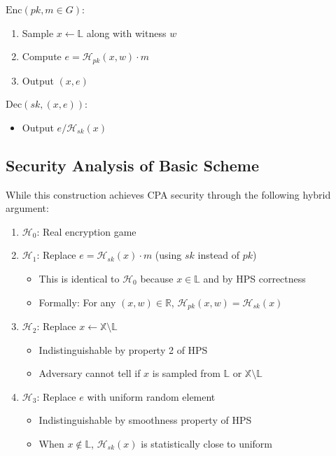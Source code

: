 $\text{Enc}(pk,m \in G)$:
\begin{enumerate}
    \item Sample $x \leftarrow \mathbb{L}$ along with witness $w$
    \item Compute $e = \mathcal{H}_{pk}(x,w) \cdot m$
    \item Output $(x,e)$
\end{enumerate}

$\text{Dec}(sk,(x,e))$:
\begin{itemize}
    \item Output $e/\mathcal{H}_{sk}(x)$
\end{itemize}

\subsection{Security Analysis of Basic Scheme}

While this construction achieves CPA security through the following hybrid argument:

\begin{enumerate}
    \item $\mathcal{H}_0$: Real encryption game
    \item $\mathcal{H}_1$: Replace $e = \mathcal{H}_{sk}(x) \cdot m$ (using $sk$ instead of $pk$)
        \begin{itemize}
            \item This is identical to $\mathcal{H}_0$ because $x \in \mathbb{L}$ and by HPS correctness
            \item Formally: For any $(x,w) \in \mathbb{R}$, $\mathcal{H}_{pk}(x,w) = \mathcal{H}_{sk}(x)$
        \end{itemize}
    \item $\mathcal{H}_2$: Replace $x \leftarrow \mathbb{X} \setminus \mathbb{L}$ 
        \begin{itemize}
            \item Indistinguishable by property 2 of HPS
            \item Adversary cannot tell if $x$ is sampled from $\mathbb{L}$ or $\mathbb{X} \setminus \mathbb{L}$
        \end{itemize}
    \item $\mathcal{H}_3$: Replace $e$ with uniform random element
        \begin{itemize}
            \item Indistinguishable by smoothness property of HPS
            \item When $x \not\in \mathbb{L}$, $\mathcal{H}_{sk}(x)$ is statistically close to uniform
        \end{itemize}
\end{enumerate}

